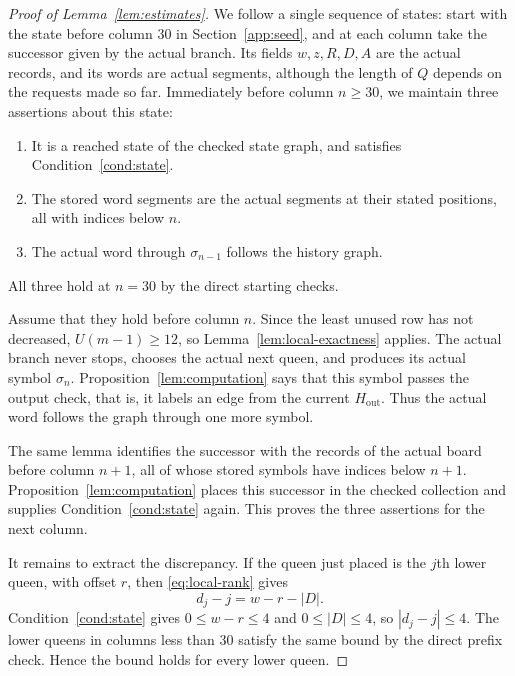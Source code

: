 \begin{proof}[Proof of Lemma~\ref{lem:estimates}]
We follow a single sequence of states: start with the state before
column $30$ in Section~\ref{app:seed}, and at each column take the
successor given by the actual branch.
Its fields $w,z,R,D,A$ are the actual records, and its words are
actual segments, although the length of $Q$ depends on the requests
made so far. Immediately before column $n\ge30$, we maintain three
assertions about this state:
\begin{enumerate}
\item It is a reached state of the checked state graph, and
satisfies Condition~\ref{cond:state}.
\item The stored word segments are the actual segments at their
stated positions, all with indices below $n$.
\item The actual word through $\sigma_{n-1}$ follows the history
graph.
\end{enumerate}
All three hold at $n=30$ by the direct starting checks.

Assume that they hold before column $n$. Since the least unused row
has not decreased, $U(m-1)\ge12$, so Lemma~\ref{lem:local-exactness}
applies. The actual branch never stops, chooses the actual next queen, and produces its actual symbol
$\sigma_n$. Proposition~\ref{lem:computation} says that this symbol
passes the output check, that is, it labels an edge from the current
$H_{\mathrm{out}}$. Thus the actual word follows the graph through
one more symbol.

The same lemma identifies the successor with the records of the
actual board before column $n+1$, all of whose stored symbols have
indices below $n+1$. Proposition~\ref{lem:computation} places this
successor in the checked collection and supplies
Condition~\ref{cond:state} again. This proves the three assertions
for the next column.

It remains to extract the discrepancy. If the queen just placed is
the $j$th lower queen, with offset $r$, then \eqref{eq:local-rank}
gives
\[
 d_j-j=w-r-|D|.
\]
Condition~\ref{cond:state} gives $0\le w-r\le4$ and $0\le|D|\le4$, so
$|d_j-j|\le4$. The lower queens in columns less than $30$ satisfy the
same bound by the direct prefix check. Hence the bound holds for
every lower queen.
\end{proof}

